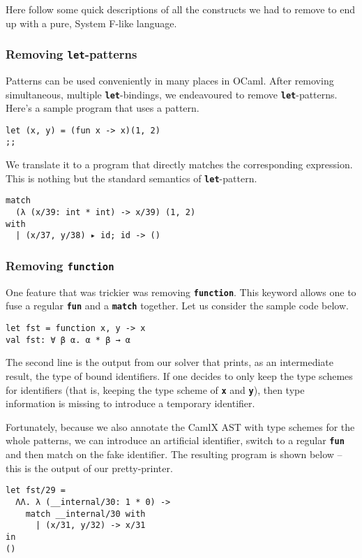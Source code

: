 \documentclass[10pt,a4paper,twoside,titlepage,twocolumn]{article}
\newcommand{\code}[1]{\textbf{\texttt{#1}}}
\begin{document}
Here follow some quick descriptions of all the constructs we had to remove to
end up with a pure, System F-like language.

\subsubsection{Removing \code{let}-patterns}

Patterns can be used conveniently in many places in OCaml. After removing
simultaneous, multiple \code{let}-bindings, we endeavoured to remove
\code{let}-patterns. Here's a sample program that uses a pattern.

\begin{verbatim}
let (x, y) = (fun x -> x)(1, 2)
;;
\end{verbatim}
We translate it to a program that directly matches the corresponding expression.
This is nothing but the standard semantics of \code{let}-pattern.
\begin{verbatim}
match
  (λ (x/39: int * int) -> x/39) (1, 2)
with
  | (x/37, y/38) ▸ id; id -> ()
\end{verbatim}

\subsubsection{Removing \code{function}}

One feature that was trickier was removing \code{function}. This keyword allows
one to fuse a regular \code{fun} and a \code{match} together. Let us consider
the sample code below.

\begin{verbatim}
let fst = function x, y -> x
val fst: ∀ β α. α * β → α
\end{verbatim}

The second line is the output from our solver that prints, as an intermediate
result, the type of bound identifiers. If one decides to only keep the type
schemes for identifiers (that is, keeping the type scheme of \code{x} and
\code{y}), then type information is missing to introduce a temporary identifier.

Fortunately, because we also annotate the CamlX AST with type schemes
for the whole patterns, we can introduce an artificial identifier, switch to a
regular \code{fun} and then match on the fake identifier. The resulting program
is shown below -- this is the output of our pretty-printer.

\begin{verbatim}
let fst/29 =
  ΛΛ. λ (__internal/30: 1 * 0) -> 
    match __internal/30 with
      | (x/31, y/32) -> x/31
in
()
\end{verbatim}
\end{document}

